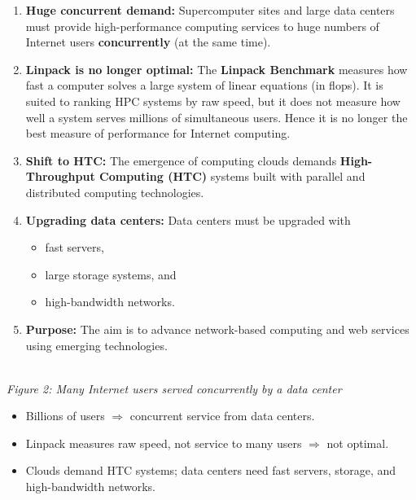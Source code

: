 \documentclass[11pt,a4paper]{article}
\newcommand{\figcap}[1]{\\[2pt]{\footnotesize\textit{#1}}}
\begin{document}
\begin{enumerate}
\item \textbf{Huge concurrent demand:} Supercomputer sites and large data centers must provide high-performance computing services to huge numbers of Internet users \textbf{concurrently} (at the same time).
\item \textbf{Linpack is no longer optimal:} The \textbf{Linpack Benchmark} measures how fast a computer solves a large system of linear equations (in flops). It is suited to ranking HPC systems by raw speed, but it does not measure how well a system serves millions of simultaneous users. Hence it is no longer the best measure of performance for Internet computing.
\item \textbf{Shift to HTC:} The emergence of computing clouds demands \textbf{High-Throughput Computing (HTC)} systems built with parallel and distributed computing technologies.
\item \textbf{Upgrading data centers:} Data centers must be upgraded with
  \begin{itemize}
  \item fast servers,
  \item large storage systems, and
  \item high-bandwidth networks.
  \end{itemize}
\item \textbf{Purpose:} The aim is to advance network-based computing and web services using emerging technologies.
\end{enumerate}

\begin{center}
\figcap{Figure 2: Many Internet users served concurrently by a data center}
\end{center}

\begin{keybox}
\begin{itemize}
\item Billions of users $\Rightarrow$ concurrent service from data centers.
\item Linpack measures raw speed, not service to many users $\Rightarrow$ not optimal.
\item Clouds demand HTC systems; data centers need fast servers, storage, and high-bandwidth networks.
\end{itemize}
\end{keybox}
\end{document}
